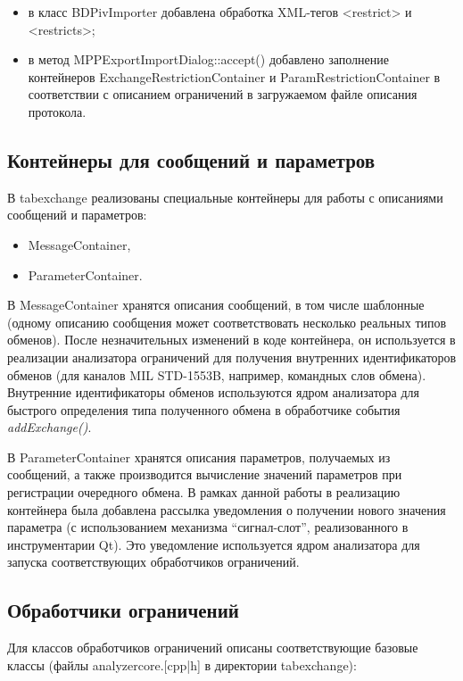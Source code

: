 \begin{itemize}
\item в класс BDPivImporter добавлена обработка XML-тегов <restrict> и 
<restricts>;
\item в метод MPPExportImportDialog::accept() добавлено заполнение контейнеров 
ExchangeRestrictionContainer и ParamRestrictionContainer в соответствии с 
описанием ограничений в загружаемом файле описания протокола.
\end{itemize}

\subsection*{Контейнеры для сообщений и параметров}

В tabexchange реализованы специальные контейнеры для работы с описаниями 
сообщений и параметров:

\begin{itemize}
 \item MessageContainer,
 \item ParameterContainer.
\end{itemize}

В MessageContainer хранятся описания сообщений, в том числе шаблонные (одному 
описанию сообщения может соответствовать несколько реальных типов обменов). 
После незначительных изменений в коде контейнера, он используется в реализации 
анализатора ограничений для получения внутренних идентификаторов обменов (для 
каналов MIL STD-1553B, например, командных слов обмена). Внутренние 
идентификаторы обменов используются ядром анализатора для быстрого определения 
типа полученного обмена в обработчике события \textit{addExchange()}.

В ParameterContainer хранятся описания параметров, получаемых из сообщений, а 
также производится вычисление значений параметров при регистрации очередного 
обмена. В рамках данной работы в реализацию контейнера была добавлена рассылка 
уведомления о получении нового значения параметра (с использованием механизма 
``сигнал-слот'', реализованного в инструментарии Qt). Это уведомление 
используется ядром анализатора для запуска соответствующих обработчиков 
ограничений.

\subsection*{Обработчики ограничений}

Для классов обработчиков ограничений описаны соответствующие базовые классы 
(файлы analyzercore.[cpp|h] в директории tabexchange):

